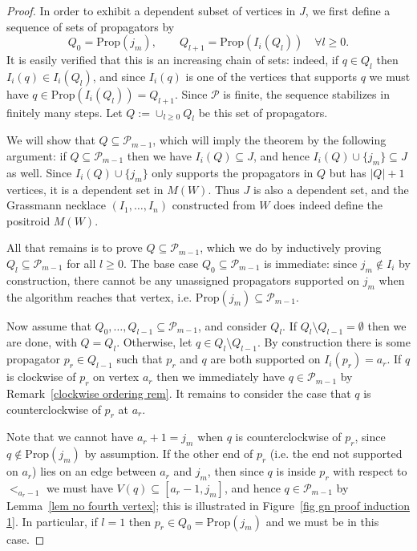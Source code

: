 \documentclass[11pt]{article}
\newcommand{\cP}{\mathcal{P}}
\newcommand{\Prop}{\textrm{Prop}}
\theoremstyle{remark}
\theoremstyle{definition}
\begin{document}
\begin{proof}
In order to exhibit a dependent subset of vertices in $J$, we first define a sequence of sets of propagators by
\[Q_0 = \Prop(j_m), \qquad Q_{l+1} = \Prop(I_i(Q_l))\quad \forall l \geq 0.\]
It is easily verified that this is an increasing chain of sets: indeed, if $q \in Q_l$ then $I_i(q) \in I_i(Q_l)$, and since $I_i(q)$ is one of the vertices that supports $q$ we must have $q \in \Prop(I_i(Q_l)) = Q_{l+1}$. Since $\cP$ is finite, the sequence stabilizes in finitely many steps. Let $Q := \cup_{l \geq 0} Q_l$ be this set of propagators.

We will show that $Q \subseteq \mathcal{P}_{m-1}$, which will imply the theorem by the following argument: if $Q \subseteq \cP_{m-1}$ then we have $I_i(Q)\subseteq J$, and hence $I_i(Q) \cup \{j_m\} \subseteq J$ as well. Since $I_i(Q) \cup \{j_m\}$ only supports the propagators in $Q$ but has $|Q|+1$ vertices, it is a dependent set in $M(W)$. Thus $J$ is also a dependent set, and the Grassmann necklace $(I_1,\dots,I_n)$ constructed from $W$ does indeed define the positroid $M(W)$.

All that remains is to prove $Q\subseteq \mathcal{P}_{m-1}$, which we do by inductively proving $Q_l \subseteq \mathcal{P}_{m-1}$ for all $l \geq 0$. The base case $Q_0 \subseteq \cP_{m-1}$ is immediate: since $j_m \not\in I_i$ by construction, there cannot be any unassigned propagators supported on $j_m$ when the algorithm reaches that vertex, i.e. ${\Prop(j_m) \subseteq \cP_{m-1}}$.

Now assume that $Q_0,\dots,Q_{l-1} \subseteq \cP_{m-1}$, and consider $Q_{l}$. If $Q_{l} \setminus Q_{l-1} = \emptyset$ then we are done, with $Q = Q_l$.  Otherwise, let $q \in Q_{l} \setminus Q_{l-1}$. By construction there is some propagator $p_r \in Q_{l-1}$ such that $p_r$ and $q$ are both supported on $I_i(p_r) = a_r$. If $q$ is clockwise of $p_r$ on vertex $a_r$ then we immediately have $q \in \cP_{m-1}$ by Remark~\ref{clockwise ordering rem}.  It remains to consider the case that $q$ is counterclockwise of $p_r$ at $a_r$.

Note that we cannot have $a_r+ 1 = j_m$ when $q$ is counterclockwise of $p_r$, since $q \not\in \Prop(j_m)$ by assumption. If the other end of $p_r$ (i.e. the end not supported on $a_r$) lies on an edge between $a_r$ and $j_m$, then since $q$ is inside $p_r$ with respect to $<_{a_r-1}$ we must have $V(q) \subseteq [a_r-1,j_m]$, and hence $q \in \cP_{m-1}$ by Lemma~\ref{lem no fourth vertex}; this is illustrated in Figure~\ref{fig gn proof induction 1}. In particular, if $l=1$ then $p_r \in Q_{0} = \Prop(j_m)$ and we must be in this case. 


\end{proof}
\end{document}
